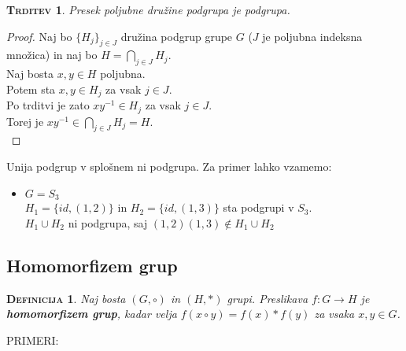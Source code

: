 \documentclass[a4paper,12pt]{article}
\newtheorem*{trditev}{\textsc{Trditev}}
\newtheorem*{definicija}{\textsc{Definicija}}
\begin{document}
\begin{trditev}
Presek poljubne družine podgrupa je podgrupa.\\
\end{trditev}

\begin{proof}
Naj bo $\{H_j\}_{j\in J}$ družina podgrup grupe $G$ ($J$ je poljubna indeksna množica) in naj bo $H=\bigcap_{j\in J} H_j$. \\

Naj bosta $x,y\in H$ poljubna. \\

Potem sta $x,y\in H_j$ za vsak $j\in J$. \\

Po trditvi je zato $xy^{-1}\in H_j$ za vsak $j\in J$. \\

Torej je $xy^{-1}\in \bigcap_{j\in J} H_j = H$.\\
\end{proof}

\noindent Unija podgrup v splošnem ni podgrupa. Za primer lahko vzamemo:
\begin{itemize}
\item $G=S_3$\\
$H_1=\{id,(1,2)\}$ in $H_2=\{id,(1,3)\}$ sta podgrupi v $S_3$. \\$H_1 \cup H_2$ ni podgrupa, saj $(1,2)(1,3)\notin H_1 \cup H_2$
\end{itemize}
\newpage 
\subsection{Homomorfizem grup}

\begin{definicija}
Naj bosta $(G,\circ)$ in $(H,*)$ grupi. Preslikava $f:G\rightarrow H$ je \textbf{homomorfizem grup}, kadar velja $f(x\circ y)=f(x)*f(y)$ za vsaka $x,y\in G$.\\
\end{definicija}

\noindent PRIMERI:
\end{document}
